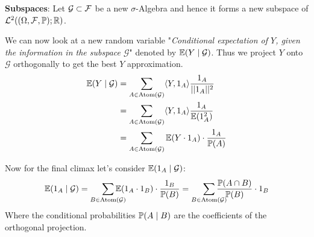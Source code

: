 \textbf{Subspaces}: Let \(\mathcal{G} \subset \F\) be a new \(\sigma\)-Algebra and hence it forms a new subspace of \(\L^2((\O, \F, \P); \R)\).

We can now look at a new random variable "\textit{Conditional expectation of \(Y\), given the information in the subspace \(\mathcal{G}\)}" denoted by \(\E(Y \mid \mathcal{G})\). Thus we project \(Y\) onto \(\mathcal{G}\) orthogonally to get the best \(Y\) approximation.
\begin{align*}
  \E(Y \mid \mathcal{G}) &= \sum_{A \in \Atom(\mathcal{G})}\langle Y, \I_A \rangle \frac{\I_A}{||\I_A||^2} \\
  &= \sum_{A \in \Atom(\mathcal{G})}\langle Y, \I_A \rangle \frac{\I_A}{\E(\I_A^2)}  \\
  &= \sum_{A \in \Atom(\mathcal{G})} \E(Y \cdot \I_A) \cdot \frac{\I_A}{\P(A)}
\end{align*}

Now for the final climax let's consider \(\E(\I_A \mid \mathcal{G})\):
\[\E(\I_A \mid \mathcal{G}) = \smashoperator[r]{\sum_{B \in \Atom(\mathcal{G})}} \E(\I_A \cdot \I_B) \cdot \frac{\I_B}{\P(B)} = \smashoperator[r]{\sum_{B \in \Atom(\mathcal{G})}} \frac{\P(A \cap B)}{\P(B)} \cdot \I_B\]
Where the conditional probabilities \(\P(A \mid B)\) are the coefficients of the orthogonal projection.
